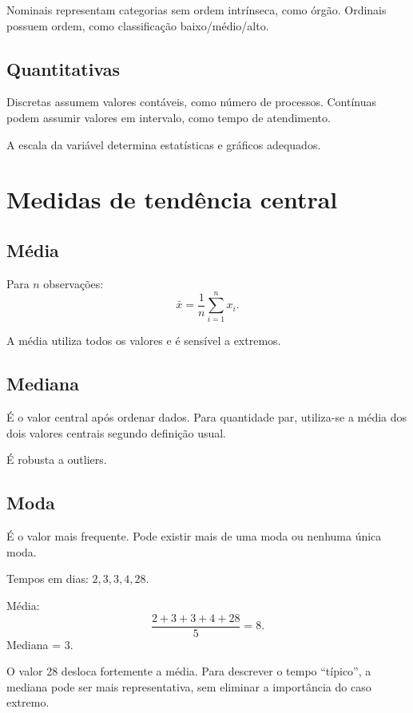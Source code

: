 Nominais representam categorias sem ordem intrínseca, como órgão. Ordinais possuem ordem, como classificação baixo/médio/alto.

\subsection{Quantitativas}

Discretas assumem valores contáveis, como número de processos. Contínuas podem assumir valores em intervalo, como tempo de atendimento.

A escala da variável determina estatísticas e gráficos adequados.

\section{Medidas de tendência central}

\subsection{Média}

Para $n$ observações:
\[
\bar{x}=\frac{1}{n}\sum_{i=1}^{n}x_i.
\]

A média utiliza todos os valores e é sensível a extremos.

\subsection{Mediana}

É o valor central após ordenar dados. Para quantidade par, utiliza-se a média dos dois valores centrais segundo definição usual.

É robusta a outliers.

\subsection{Moda}

É o valor mais frequente. Pode existir mais de uma moda ou nenhuma única moda.

\begin{exemplo}
Tempos em dias: $2,3,3,4,28$.

Média:
\[
\frac{2+3+3+4+28}{5}=8.
\]
Mediana = 3.

O valor 28 desloca fortemente a média. Para descrever o tempo ``típico'', a mediana pode ser mais representativa, sem eliminar a importância do caso extremo.
\end{exemplo}


